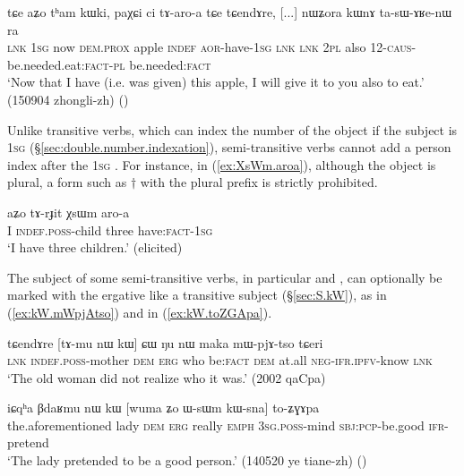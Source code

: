 \begin{exe}
\ex \label{ex:paXCi.ci.taroa}
\gll  tɕe aʑo tʰam kɯki, paχɕi ci tɤ-aro-a tɕe tɕendɤre, 
[...] nɯʑora kɯnɤ ta-sɯ-ɤʁe-nɯ ra \\
\textsc{lnk} \textsc{1sg} now \textsc{dem}.\textsc{prox} apple \textsc{indef} \textsc{aor}-have-\textsc{1sg} \textsc{lnk} \textsc{lnk} { } \textsc{2pl} also 1\fl{}2-\textsc{caus}-be.needed.eat:\textsc{fact}-\textsc{pl} be.needed:\textsc{fact} \\
\glt `Now that I have (i.e. was given) this apple, I will give it to you also to eat.' (150904 zhongli-zh)
()
\end{exe}

Unlike transitive verbs, which can index the number of the object if the subject is \textsc{1sg} (§\ref{sec:double.number.indexation}), semi-transitive verbs cannot add a person index after the \textsc{1sg} . For instance, in (\ref{ex:XsWm.aroa}), although the object is plural, a form such as $\dagger$ with the  plural prefix is strictly prohibited. 

\begin{exe}
\ex   \label{ex:XsWm.aroa}
 \gll aʑo tɤ-rɟit χsɯm aro-a   \\
I \textsc{indef}.\textsc{poss}-child three have:\textsc{fact}-\textsc{1sg} \\
 \glt `I have three children.' (elicited)
\end{exe} 

The subject of some semi-transitive verbs, in particular  and , can optionally be marked with the ergative like a transitive subject (§\ref{sec:S.kW}), as  in (\ref{ex:kW.mWpjAtso}) and  in (\ref{ex:kW.toZGApa}). 

\begin{exe}
\ex   \label{ex:kW.mWpjAtso}
 \gll  tɕendɤre [tɤ-mu nɯ kɯ] ɕɯ ŋu nɯ maka mɯ-pjɤ-tso tɕeri \\
\textsc{lnk} \textsc{indef}.\textsc{poss}-mother \textsc{dem} \textsc{erg} who be:\textsc{fact} \textsc{dem} at.all \textsc{neg}-\textsc{ifr}.\textsc{ipfv}-know \textsc{lnk} \\
\glt `The old woman did not realize who it was.' (2002 qaCpa)
\end{exe}

\begin{exe}
\ex   \label{ex:kW.toZGApa}
 \gll iɕqʰa βdaʁmu nɯ kɯ [wuma ʑo ɯ-sɯm kɯ-sna] to-ʑɣɤpa \\
 the.aforementioned lady \textsc{dem} \textsc{erg} really \textsc{emph} \textsc{3sg}.\textsc{poss}-mind \textsc{sbj}:\textsc{pcp}-be.good \textsc{ifr}-pretend \\
 \glt `The lady pretended to be a good person.' (140520 ye tiane-zh) ()
\end{exe}



